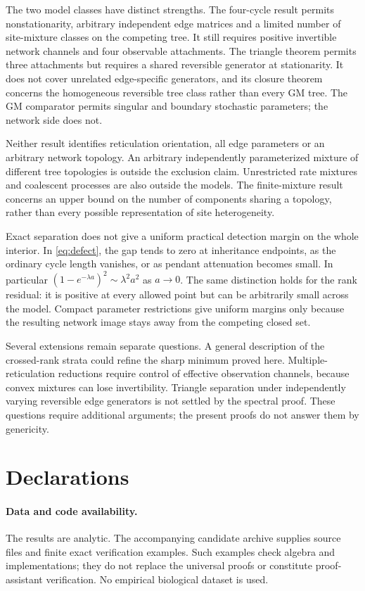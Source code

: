\documentclass[11pt]{article}
\theoremstyle{definition}
\theoremstyle{remark}
\begin{document}
The two model classes have distinct strengths. The four-cycle result
permits nonstationarity, arbitrary independent edge matrices and a limited
number of site-mixture classes on the competing tree. It still requires
positive invertible network channels and four observable attachments.
The triangle theorem permits three attachments but requires a shared
reversible generator at stationarity. It does not cover unrelated
edge-specific generators, and its closure theorem concerns the homogeneous
reversible tree class rather than every GM tree. The GM comparator permits
singular and boundary stochastic parameters; the network side does not.

Neither result identifies reticulation orientation, all edge parameters or
an arbitrary network topology. An arbitrary independently parameterized
mixture of different tree topologies is outside the exclusion claim.
Unrestricted rate mixtures and coalescent processes are also outside the
models. The finite-mixture result concerns an upper bound on the number of
components sharing a topology, rather than every possible representation
of site heterogeneity.

Exact separation does not give a uniform practical detection margin on the
whole interior. In \eqref{eq:defect}, the gap tends to zero at inheritance
endpoints, as the ordinary cycle length vanishes, or as pendant attenuation
becomes small. In particular
$(1-e^{-\lambda a})^2\sim\lambda^2a^2$ as $a\to0$.
The same distinction holds for the rank residual: it is positive at every
allowed point but can be arbitrarily small across the model. Compact
parameter restrictions give uniform margins only because the resulting
network image stays away from the competing closed set.

Several extensions remain separate questions. A general description of the
crossed-rank strata could refine the sharp minimum proved here.
Multiple-reticulation reductions require control of effective observation
channels, because convex mixtures can lose invertibility. Triangle
separation under independently varying reversible edge generators is not
settled by the spectral proof. These questions require additional
arguments; the present proofs do not answer them by genericity.

\section*{Declarations}

\paragraph{Data and code availability.}
The results are analytic. The accompanying candidate archive supplies source
files and finite exact verification examples. Such examples check algebra
and implementations; they do not replace the universal proofs or constitute
proof-assistant verification. No empirical biological dataset is used.
\end{document}
